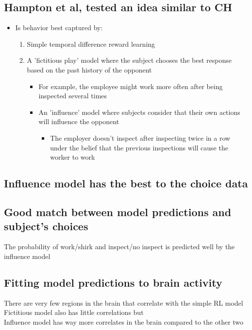 \subsection{Hampton et al, tested an idea similar to CH}
\begin{itemize}
    \item Is behavior best captured by:
    \begin{enumerate}
        \item Simple temporal difference reward learning
        \item A 'fictitious play' model where the subject chooses the best response based on the past history of the opponent
        \begin{itemize}
            \item For example, the employee might work more often after being inspected several times
            \item An 'influence' model where subjects consider that their own actions will influence the opponent
            \begin{itemize}
                \item The employer doesn't inspect after inspecting twice in a row under the belief that the previous inspections will cause the worker to work
            \end{itemize}
        \end{itemize}
    \end{enumerate}
\end{itemize}
\subsection{Influence model has the best to the choice data}
\subsection{Good match between model predictions and subject's choices}
The probability of work/shirk and inspect/no inspect is predicted well by the influence model
\subsection{Fitting model predictions to brain activity}
There are very few regions in the brain that correlate with the simple RL model
\\Fictitious model also has little correlations but
\\Influence model has way more correlates in the brain compared to the other two

